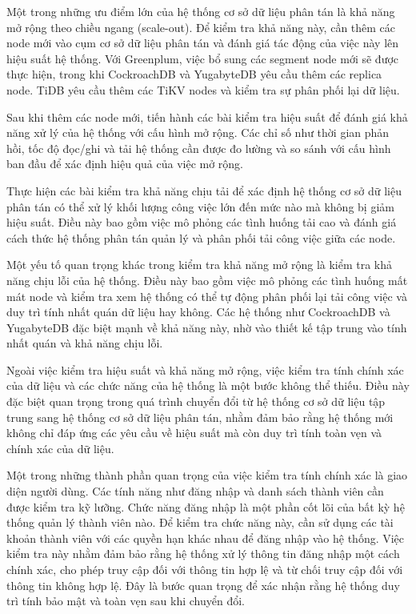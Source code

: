 \documentclass[14pt]{article}
\begin{document}
Một trong những ưu điểm lớn của hệ thống cơ sở dữ liệu phân tán là khả năng mở rộng theo chiều ngang (scale-out). Để kiểm tra khả năng này, cần thêm các node mới vào cụm cơ sở dữ liệu phân tán và đánh giá tác động của việc này lên hiệu suất hệ thống. Với Greenplum, việc bổ sung các segment node mới sẽ được thực hiện, trong khi CockroachDB và YugabyteDB yêu cầu thêm các replica node. TiDB yêu cầu thêm các TiKV nodes và kiểm tra sự phân phối lại dữ liệu.

Sau khi thêm các node mới, tiến hành các bài kiểm tra hiệu suất để đánh giá khả năng xử lý của hệ thống với cấu hình mở rộng. Các chỉ số như thời gian phản hồi, tốc độ đọc/ghi và tải hệ thống cần được đo lường và so sánh với cấu hình ban đầu để xác định hiệu quả của việc mở rộng.

Thực hiện các bài kiểm tra khả năng chịu tải để xác định hệ thống cơ sở dữ liệu phân tán có thể xử lý khối lượng công việc lớn đến mức nào mà không bị giảm hiệu suất. Điều này bao gồm việc mô phỏng các tình huống tải cao và đánh giá cách thức hệ thống phân tán quản lý và phân phối tải công việc giữa các node.

Một yếu tố quan trọng khác trong kiểm tra khả năng mở rộng là kiểm tra khả năng chịu lỗi của hệ thống. Điều này bao gồm việc mô phỏng các tình huống mất mát node và kiểm tra xem hệ thống có thể tự động phân phối lại tải công việc và duy trì tính nhất quán dữ liệu hay không. Các hệ thống như CockroachDB và YugabyteDB đặc biệt mạnh về khả năng này, nhờ vào thiết kế tập trung vào tính nhất quán và khả năng chịu lỗi.

Ngoài việc kiểm tra hiệu suất và khả năng mở rộng, việc kiểm tra tính chính xác của dữ liệu và các chức năng của hệ thống là một bước không thể thiếu. Điều này đặc biệt quan trọng trong quá trình chuyển đổi từ hệ thống cơ sở dữ liệu tập trung sang hệ thống cơ sở dữ liệu phân tán, nhằm đảm bảo rằng hệ thống mới không chỉ đáp ứng các yêu cầu về hiệu suất mà còn duy trì tính toàn vẹn và chính xác của dữ liệu.

Một trong những thành phần quan trọng của việc kiểm tra tính chính xác là giao diện người dùng. Các tính năng như đăng nhập và danh sách thành viên cần được kiểm tra kỹ lưỡng. Chức năng đăng nhập là một phần cốt lõi của bất kỳ hệ thống quản lý thành viên nào. Để kiểm tra chức năng này, cần sử dụng các tài khoản thành viên với các quyền hạn khác nhau để đăng nhập vào hệ thống. Việc kiểm tra này nhằm đảm bảo rằng hệ thống xử lý thông tin đăng nhập một cách chính xác, cho phép truy cập đối với thông tin hợp lệ và từ chối truy cập đối với thông tin không hợp lệ. Đây là bước quan trọng để xác nhận rằng hệ thống duy trì tính bảo mật và toàn vẹn sau khi chuyển đổi.
\end{document}
